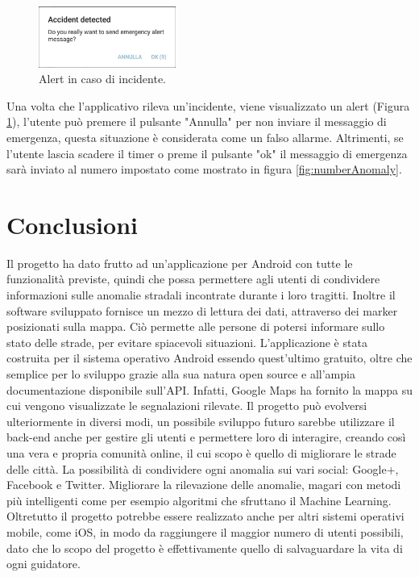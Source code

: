 \documentclass[a4paper, 11pt]{article} %
\begin{document}
\begin{figure} %
	\begin{center}
		\includegraphics[width=0.4\textwidth]{images/alert.jpg}
	\end{center}
	\caption{Alert in caso di incidente.}
	\label{fig:accidentDetected}
\end{figure}
Una volta che l'applicativo rileva un'incidente, viene visualizzato un alert (Figura \ref{fig:accidentDetected}), l'utente può premere il pulsante "Annulla" per non inviare il messaggio di emergenza, questa situazione è considerata come un falso allarme. Altrimenti, se l'utente lascia scadere il timer o preme il pulsante "ok" il messaggio di emergenza sarà inviato al numero impostato come mostrato in figura \ref{fig:numberAnomaly}.

\newpage
\section{Conclusioni}
Il progetto ha dato frutto ad un'applicazione per Android con tutte le funzionalità previste, quindi che possa permettere agli utenti di condividere informazioni sulle anomalie stradali incontrate durante i loro tragitti. Inoltre il software sviluppato fornisce un mezzo di lettura dei dati, attraverso dei marker posizionati sulla mappa. Ciò permette alle persone di potersi informare sullo stato delle strade, per evitare spiacevoli situazioni. L'applicazione è stata costruita per il sistema operativo Android essendo quest'ultimo gratuito, oltre che semplice per lo sviluppo grazie alla sua natura open source e all'ampia documentazione disponibile sull'API. Infatti, Google Maps ha fornito la mappa su cui vengono visualizzate le segnalazioni rilevate. Il progetto può evolversi ulteriormente in diversi modi, un possibile sviluppo futuro sarebbe utilizzare il back-end anche per gestire gli utenti e permettere loro di interagire, creando così una vera e propria comunità online, il cui scopo è quello di migliorare le strade delle città. La possibilità di condividere ogni anomalia sui vari social: Google+, Facebook e Twitter. Migliorare la rilevazione delle anomalie, magari con metodi più intelligenti come per esempio algoritmi che sfruttano il Machine Learning. Oltretutto il progetto potrebbe essere realizzato anche per altri sistemi operativi mobile, come iOS, in modo da raggiungere il maggior numero di utenti possibili, dato che lo scopo del progetto è effettivamente quello di salvaguardare la vita di ogni guidatore.
\newpage




\end{document}
